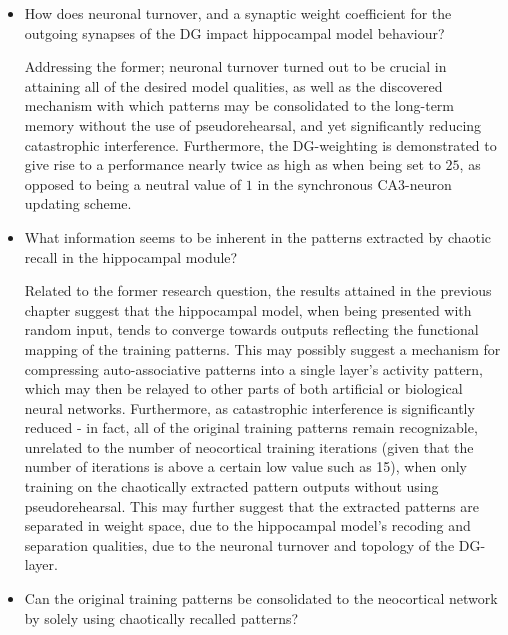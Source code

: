 \begin{itemize}
    \item How does neuronal turnover, and a synaptic weight coefficient for the outgoing synapses of the DG impact hippocampal model behaviour?
    
    Addressing the former; neuronal turnover turned out to be crucial in attaining all of the desired model qualities, as well as the discovered mechanism with which patterns may be consolidated to the long-term memory without the use of pseudorehearsal, and yet significantly reducing catastrophic interference.
    Furthermore, the DG-weighting is demonstrated to give rise to a performance nearly twice as high as when being set to $25$, as opposed to being a neutral value of $1$ in the synchronous CA3-neuron updating scheme.
    
    \item What information seems to be inherent in the patterns extracted by chaotic recall in the hippocampal module?
    
    Related to the former research question, the results attained in the previous chapter suggest that the hippocampal model, when being presented with random input, tends to converge towards outputs reflecting the functional mapping of the training patterns. This may possibly suggest a mechanism for compressing auto-associative patterns into a single layer's activity pattern, which may then be relayed to other parts of both artificial or biological neural networks. Furthermore, as catastrophic interference is significantly reduced - in fact, all of the original training patterns remain recognizable, unrelated to the number of neocortical training iterations (given that the number of iterations is above a certain low value such as 15), when only training on the chaotically extracted pattern outputs without using pseudorehearsal. This may further suggest that the extracted patterns are separated in weight space, due to the hippocampal model's recoding and separation qualities, due to the neuronal turnover and topology of the DG-layer.
    
    \item Can the original training patterns be consolidated to the neocortical network by solely using chaotically recalled patterns?
    

\end{itemize}
